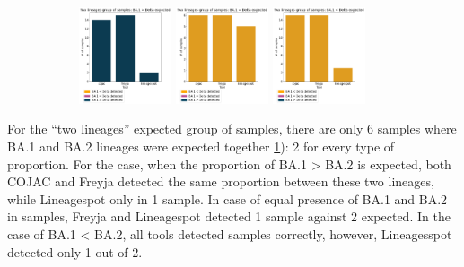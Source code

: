 \begin{figure}[H]
\begin{subfigure}{\linewidth}
                    \label{fig:results:mock:ba1-ba2}
                    \end{subfigure}\par\medskip
                    \begin{subfigure}{\linewidth}
                	\centering
                    \includegraphics[width=0.3\textwidth]{figures/results/mock/ba1Gd-bars.png}\hfill
                    \includegraphics[width=0.3\textwidth]{figures/results/mock/ba1EQd-bars.png}\hfill
                    \includegraphics[width=0.3\textwidth]{figures/results/mock/ba1Ld-bars.png}
                    \label{fig:results:mock:ba1-delta}
                    \end{subfigure}\par\medskip
                \end{figure}
                
                For the “two lineages” expected group of samples, there are only 6 samples where BA.1 and BA.2 lineages were expected together \cref{fig:results:mock:ba1-ba2}): 2 for every type of proportion. For the case, when the proportion of BA.1 > BA.2 is expected, both COJAC and Freyja detected the same proportion between these two lineages, while Lineagespot only in 1 sample. In case of equal presence of BA.1 and BA.2 in samples, Freyja and Lineagespot detected 1 sample against 2 expected. In the case of BA.1 < BA.2, all tools detected samples correctly, however, Lineagesspot detected only 1 out of 2. 

